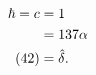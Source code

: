 \begin{texcode}[basicstyle=\scriptsize\ttfamily, emph={[1]align}, moretexcs={\notag,\tag}]
  \begin{align}
      \hbar = c & = 1          \\
      \notag    & = 137\alpha  \\
      \tag{42}  & = \hat\delta.
  \end{align}
\end{texcode}